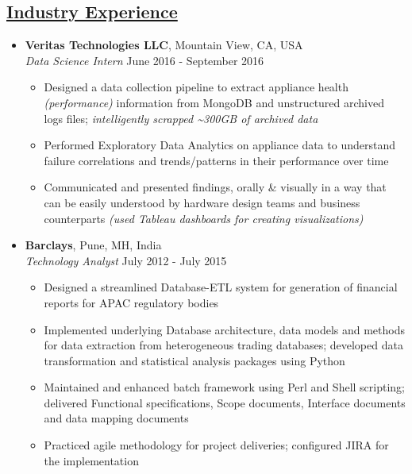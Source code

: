 \documentclass[10pt]{article}
\begin{document}
\subsection*{\underline{Industry Experience}}
\vspace{-0.05cm}
\begin{itemize}[leftmargin=0.15in]
\item {\bfseries Veritas Technologies LLC}, Mountain View, CA, USA \\
{\sl Data Science Intern}  \hfill June 2016 - September 2016
\vspace{-0.25cm}
\begin{itemize}
\setlength{\itemsep}{0pt}%
\item Designed a data collection pipeline to extract appliance health \textit{(performance)} information from MongoDB and unstructured archived logs files; \textit {intelligently scrapped \~{}300GB of archived data}
\item Performed Exploratory Data Analytics on appliance data to understand failure correlations and trends/patterns in their performance over time
\item Communicated and presented findings, orally \& visually in a way that can be easily understood by hardware design teams and business counterparts \textit{(used Tableau dashboards for creating visualizations)}
\end{itemize}

\item  {\bfseries Barclays}, Pune, MH, India \\
{\sl Technology Analyst} \hfill July 2012 - July 2015
\vspace{-0.25cm}
\begin{itemize}
\setlength{\itemsep}{0pt}%
\item Designed a streamlined Database-ETL system for generation of financial reports for APAC regulatory bodies
\item Implemented underlying Database architecture, data models and methods for data extraction from heterogeneous trading databases; developed data transformation and statistical analysis packages using Python
\item Maintained and enhanced batch framework using Perl and Shell scripting; delivered Functional specifications, Scope documents, Interface documents and data mapping documents
\item Practiced agile methodology for project deliveries; configured JIRA for the implementation
\end{itemize}
\end{itemize}
\end{document}
